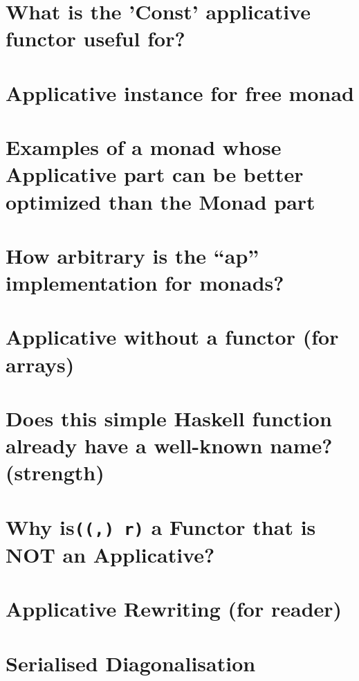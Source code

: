 \documentclass{book}%
\begin{document}
\section{What is the 'Const' applicative functor useful for?}


\section{Applicative instance for free monad}


\section{Examples of a monad whose Applicative part can be better optimized than the Monad part}


\section{How arbitrary is the “ap” implementation for monads?}


\section{Applicative without a functor (for arrays)}


\section{Does this simple Haskell function already have a well-known name? (strength)}


\section{Why is{\texttt{((,) r)}} a Functor that is NOT an Applicative?}


\section{Applicative Rewriting (for reader)}


\section{Serialised Diagonalisation}

\end{document}
